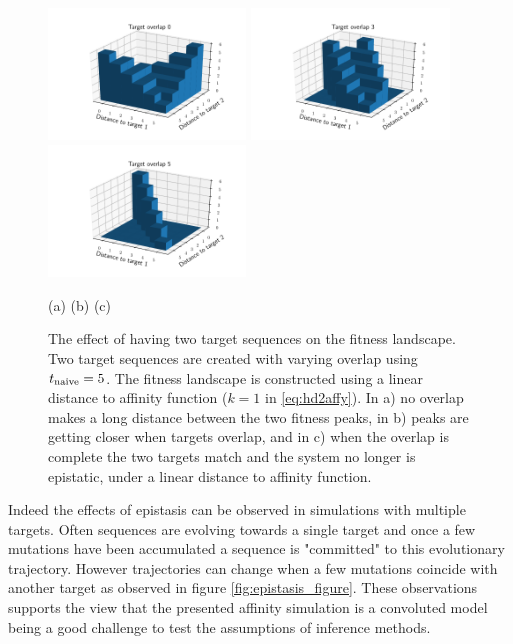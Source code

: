 \begin{figure}[!ht]
\begin{center}
\includegraphics[height=35mm]{figures/fitness_overlap0.pdf}
\includegraphics[height=35mm]{figures/fitness_overlap3.pdf}
\includegraphics[height=35mm]{figures/fitness_overlap5.pdf} \newline%
\end{center}
\vspace{-6mm} \hspace{26mm} (a) \hspace{39mm} (b) \hspace{39mm} (c)
    \caption{
    \label{fig:epistasis}
        The effect of having two target sequences on the fitness landscape.
        Two target sequences are created with varying overlap using $t_{\text{naive}}=5$.
        The fitness landscape is constructed using a linear distance to affinity function ($k=1$ in \eqref{eq:hd2affy}).
        In a) no overlap makes a long distance between the two fitness peaks, in b) peaks are getting closer when targets overlap, and in c) when the overlap is complete the two targets match and the system no longer is epistatic, under a linear distance to affinity function.
        }
\end{figure}


Indeed the effects of epistasis can be observed in simulations with multiple targets.
Often sequences are evolving towards a single target and once a few mutations have been accumulated a sequence is "committed" to this evolutionary trajectory.
However trajectories can change when a few mutations coincide with another target as observed in figure \ref{fig:epistasis_figure}.
These observations supports the view that the presented affinity simulation is a convoluted model being a good challenge to test the assumptions of inference methods.

